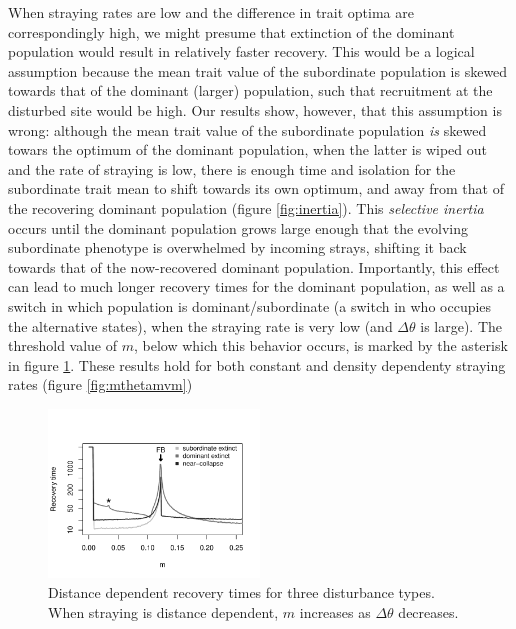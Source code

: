 \documentclass[twocolumn,preprintnumbers,amsmath,amssymb,superscriptaddress]{revtex4}
\begin{document}
When straying rates are low and the difference in trait optima are correspondingly high, we might presume that extinction of the dominant population would result in relatively faster recovery.
This would be a logical assumption because the mean trait value of the subordinate population is skewed towards that of the dominant (larger) population, such that recruitment at the disturbed site would be high.
Our results show, however, that this assumption is wrong: although the mean trait value of the subordinate population \emph{is} skewed towars the optimum of the dominant population, when the latter is wiped out and the rate of straying is low, there is enough time and isolation for the subordinate trait mean to shift towards its own optimum, and away from that of the recovering dominant population (figure \ref{fig:inertia}).
This \emph{selective inertia} occurs until the dominant population grows large enough that the evolving subordinate phenotype is overwhelmed by incoming strays, shifting it back towards that of the now-recovered dominant population.
Importantly, this effect can lead to much longer recovery times for the dominant population, as well as a switch in which population is dominant/subordinate (a switch in who occupies the alternative states), when the straying rate is very low (and $\Delta\theta$ is large).
The threshold value of $m$, below which this behavior occurs, is marked by the asterisk in figure \ref{fig:mtheta}. %
These results hold for both constant and density dependenty straying rates (figure \ref{fig:mthetamvm})


\begin{figure}
  \captionsetup{justification=raggedright,
singlelinecheck=false
}
  \centering
  \includegraphics[width=0.5\textwidth]{figs2/fig_mtheta_rt.pdf}
  \caption{
  Distance dependent recovery times for three disturbance types. When straying is distance dependent, $m$ increases as $\Delta\theta$ decreases.
  } \label{fig:mtheta}
\end{figure}
\end{document}
